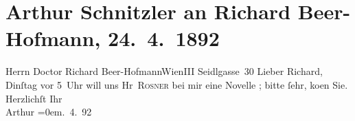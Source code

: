 

         
         \renewcommand{\erwaehntePersonen}{Personen: Richard Beer-Hofmann, Karl Peter Rosner}
         \renewcommand{\erwaehnteOrte}{Orte: I., Innere Stadt, Seidlgasse, Wien}
         \renewcommand{\erwaehnteWerke}{}
               \section[Arthur Schnitzler an Richard Beer-Hofmann, 24. 4. 1892]{ Arthur Schnitzler an Richard Beer-Hofmann, 24. 4. 1892}\nopagebreak{}\rehead{ }\begin{ledgroupsized}[t]{13cm}\normalsize\beginnumbering \toendnotes[C]{\smallbreak\pagebreak[2]} 
\toendnotes[C]{\smallbreak}\pstart{}{\pb}Herrn Doctor Richard Beer-Hofmann\pend{}\pstart{}Wien\pend{}\pstart{}III Seidlgasse 30\pend{}{\bigskip}\pstart
           \noindent{}{\pb}Lieber Richard,{ }Dinſtag vor 5 Uhr will uns Hr \textsc{Rosner} bei mir eine Novelle \label{K_L00097-1v}\label{K_L00097-1h}; bitte ſehr, ko{\geminationm}en
               Sie.\pend
           \pstart
           Herzlichſt Ihr{\\[\baselineskip]}\spacefill\mbox{Arthur}\pend
           \leftskip=0em{}. 4. 92\pend
           
         
         \endnumbering{}\end{ledgroupsized}  \newcommand{\dateiname}{L00097}\newcommand{\titel}{Arthur Schnitzler an Richard Beer-Hofmann, 24. 4. 1892}\newcommand{\editorInnen}{Martin Anton Müller und Gerd-Hermann Susen}
      